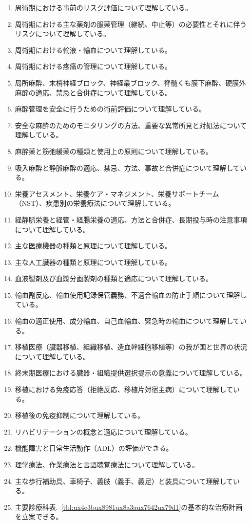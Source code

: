 \begin{enumerate}
\item
  周術期における事前のリスク評価について理解している。
\item
  周術期における主な薬剤の服薬管理（継続、中止等）の必要性とそれに伴うリスクについて理解している。
\item
  周術期における輸液・輸血について理解している。
\item
  周術期における疼痛の管理について理解している。
\item
  局所麻酔、末梢神経ブロック、神経叢ブロック、脊髄くも膜下麻酔、硬膜外麻酔の適応、禁忌と合併症について理解している。
\item
  麻酔管理を安全に行うための術前評価について理解している。
\item
  安全な麻酔のためのモニタリングの方法、重要な異常所見と対処法について理解している。
\item
  麻酔薬と筋弛緩薬の種類と使用上の原則について理解している。
\item
  吸入麻酔と静脈麻酔の適応、禁忌、方法、事故と合併症について理解している。
\item
  栄養アセスメント、栄養ケア・マネジメント、栄養サポートチーム（NST）、疾患別の栄養療法について理解している。
\item
  経静脈栄養と経管・経腸栄養の適応、方法と合併症、長期投与時の注意事項について理解している。
\item
  主な医療機器の種類と原理について理解している。
\item
  主な人工臓器の種類と原理について理解している。
\item
  血液製剤及び血漿分画製剤の種類と適応について理解している。
\item
  輸血副反応、輸血使用記録保管義務、不適合輸血の防止手順について理解している。
\item
  輸血の適正使用、成分輸血、自己血輸血、緊急時の輸血について理解している。
\item
  移植医療（臓器移植、組織移植、造血幹細胞移植等）の我が国と世界の状況について理解している。
\item
  終末期医療における臓器・組織提供選択提示の意義について理解している。
\item
  移植における免疫応答（拒絶反応、移植片対宿主病）について理解している。
\item
  移植後の免疫抑制について理解している。
\item
  リハビリテーションの概念と適応について理解している。
\item
  機能障害と日常生活動作（ADL）の評価ができる。
\item
  理学療法、作業療法と言語聴覚療法について理解している。
\item
  主な歩行補助具、車椅子、義肢（義手、義足）と装具について理解している。
\item
  主要診療科表.~\ref{tbl:ux4e3bux8981ux8a3aux7642ux79d1}の基本的な治療計画を立案できる。
\end{enumerate}

